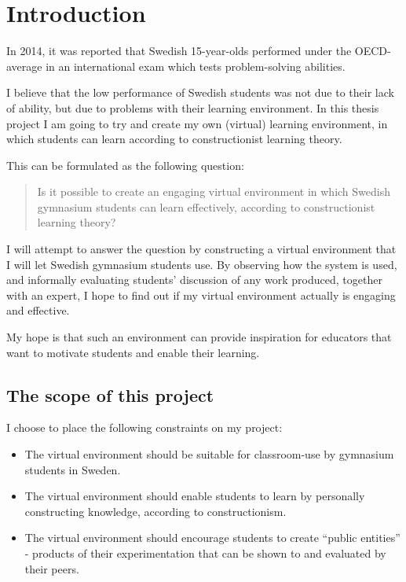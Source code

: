 \chapter{Introduction}

In 2014, it was reported that Swedish 15-year-olds performed under the OECD-average in an international exam which tests problem-solving abilities\cite{skolverket:pisa}.

I believe that the low performance of Swedish students was not due to their lack of ability, but due to problems with their learning environment. In this thesis project I am going to try and create my own (virtual) learning environment, in which students can learn according to constructionist learning theory.

This can be formulated as the following question:
\begin{quote}
Is it possible to create an engaging virtual environment in which Swedish gymnasium students can learn effectively, according to constructionist learning theory?
\end{quote}

I will attempt to answer the question by constructing a virtual environment that I will let Swedish gymnasium students use. By observing how the system is used, and informally evaluating students' discussion of any work produced, together with an expert, I hope to find out if my virtual environment actually is engaging and effective.

My hope is that such an environment can provide inspiration for educators that want to motivate students and enable their learning. 

\section{The scope of this project}

I choose to place the following constraints on my project:
\begin{itemize}
  \item The virtual environment should be suitable for classroom-use by gymnasium students in Sweden.
  \item The virtual environment should enable students to learn by personally constructing knowledge, according to constructionism.
  \item The virtual environment should encourage students to create ``public entities'' - products of their experimentation that can be shown to and evaluated by their peers.
\end{itemize}
